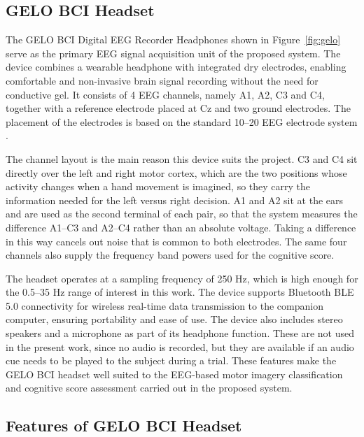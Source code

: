 \subsection{GELO BCI Headset}
The GELO BCI Digital EEG Recorder Headphones shown in Figure~\ref{fig:gelo} serve as the
primary EEG signal acquisition unit of the proposed system. The device combines a wearable
headphone with integrated dry electrodes, enabling comfortable and non-invasive brain
signal recording without the need for conductive gel. It consists of 4 EEG channels, namely
A1, A2, C3 and C4, together with a reference electrode placed at Cz and two ground
electrodes. The placement of the electrodes is based on the standard 10--20 EEG electrode
system \cite{gelo2026manual}.

The channel layout is the main reason this device suits the project. C3 and C4 sit directly
over the left and right motor cortex, which are the two positions whose activity changes
when a hand movement is imagined, so they carry the information needed for the left versus
right decision. A1 and A2 sit at the ears and are used as the second terminal of each pair,
so that the system measures the difference A1--C3 and A2--C4 rather than an absolute
voltage. Taking a difference in this way cancels out noise that is common to both
electrodes. The same four channels also supply the frequency band powers used for the
cognitive score.

The headset operates at a sampling frequency of 250 Hz, which is high enough for the
0.5--35 Hz range of interest in this work. The device supports Bluetooth BLE 5.0
connectivity for wireless real-time data transmission to the companion computer, ensuring
portability and ease of use. The device also includes stereo speakers and a microphone as
part of its headphone function. These are not used in the present work, since no audio is
recorded, but they are available if an audio cue needs to be played to the subject during a
trial. These features make the GELO BCI headset well suited to the EEG-based motor imagery
classification and cognitive score assessment carried out in the proposed system.

\subsection{Features of GELO BCI Headset}

